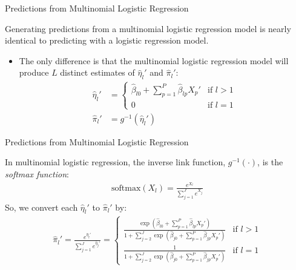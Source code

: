 \documentclass{beamer}\usepackage[]{graphicx}\usepackage[]{color}
\begin{document}

\begin{frame}{Predictions from Multinomial Logistic Regression}
  
  Generating predictions from a multinomial logistic regression model is nearly 
  identical to predicting with a logistic regression model.
  \vc
  \begin{itemize}
  \item The only difference is that the multinomial logistic regression model 
    will produce $L$ distinct estimates of $\hat{\eta}_l'$ and $\hat{\pi}_l'$:
    \begin{align*}
      \hat{\eta}_l' &= 
      \begin{cases}
        \hat{\beta}_{l0} + \sum_{p = 1}^P \hat{\beta}_{lp} X_p' & \text{if $l > 1$}\\
        0 & \text{if $l = 1$}
      \end{cases}\\[8pt]
      \hat{\pi}_l' &= g^{-1}(\hat{\eta}_l')
    \end{align*}
  \end{itemize}
  
\end{frame}


\begin{frame}{Predictions from Multinomial Logistic Regression}
  
  In multinomial logistic regression, the inverse link function, $g^{-1}(\cdot)$, 
  is the \emph{softmax function}:
  \begin{align*}
    \text{softmax}(X_l) = \frac{e^{X_l}}{\sum_{j = 1}^Je^{X_j}}
  \end{align*}
  So, we convert each $\hat{\eta}_l'$ to $\hat{\pi}_l'$ by:
  \begin{align*}
    \hat{\pi}_l' = \frac{e^{\hat{\eta}_l'}}{\sum_{j = 1}^J e^{\hat{\eta}_j'}} = 
    \begin{cases}
      \frac{\exp \left( 
        \hat{\beta}_{l0} + \sum_{p = 1}^P \hat{\beta}_{lp} X_p' \right) }
           {1 + \sum_{j = 2}^J \exp \left(
             \hat{\beta}_{j0} + \sum_{p = 1}^P \hat{\beta}_{jp} X_p' 
             \right) } & \text{if $l > 1$}\\[16pt]
           \frac{1}
                {1 + \sum_{j = 2}^J \exp \left(
                  \hat{\beta}_{j0} + \sum_{p = 1}^P \hat{\beta}_{jp} X_p' 
                  \right) } & \text{if $l = 1$}
    \end{cases}
  \end{align*}
           
\end{frame}
\end{document}
